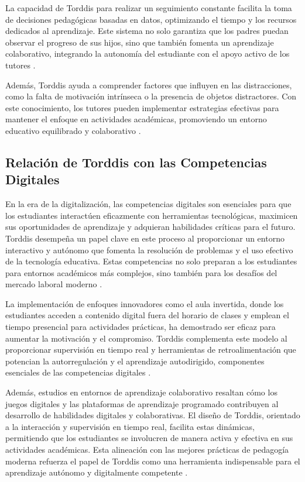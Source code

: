 \documentclass[a4paper,fleqn]{cas-sc}
\begin{document}
			La capacidad de Torddis para realizar un seguimiento constante facilita la toma de decisiones pedagógicas basadas en datos, optimizando el tiempo y los recursos dedicados al aprendizaje. Este sistema no solo garantiza que los padres puedan observar el progreso de sus hijos, sino que también fomenta un aprendizaje colaborativo, integrando la autonomía del estudiante con el apoyo activo de los tutores \citep{Navarro2024}.
		
			Además, Torddis ayuda a comprender factores que influyen en las distracciones, como la falta de motivación intrínseca o la presencia de objetos distractores. Con este conocimiento, los tutores pueden implementar estrategias efectivas para mantener el enfoque en actividades académicas, promoviendo un entorno educativo equilibrado y colaborativo \citep{Ackermans2025Young}.
		
		\subsection{Relación de Torddis con las Competencias Digitales}
			En la era de la digitalización, las competencias digitales son esenciales para que los estudiantes interactúen eficazmente con herramientas tecnológicas, maximicen sus oportunidades de aprendizaje y adquieran habilidades críticas para el futuro. Torddis desempeña un papel clave en este proceso al proporcionar un entorno interactivo y autónomo que fomenta la resolución de problemas y el uso efectivo de la tecnología educativa. Estas competencias no solo preparan a los estudiantes para entornos académicos más complejos, sino también para los desafíos del mercado laboral moderno \citep{Mohamed2018Implementing}.
		
			La implementación de enfoques innovadores como el aula invertida, donde los estudiantes acceden a contenido digital fuera del horario de clases y emplean el tiempo presencial para actividades prácticas, ha demostrado ser eficaz para aumentar la motivación y el compromiso. Torddis complementa este modelo al proporcionar supervisión en tiempo real y herramientas de retroalimentación que potencian la autorregulación y el aprendizaje autodirigido, componentes esenciales de las competencias digitales \citep{Mohamed2018Implementing,Echeverria2011AFramework}.
		
			Además, estudios en entornos de aprendizaje colaborativo resaltan cómo los juegos digitales y las plataformas de aprendizaje programado contribuyen al desarrollo de habilidades digitales y colaborativas. El diseño de Torddis, orientado a la interacción y supervisión en tiempo real, facilita estas dinámicas, permitiendo que los estudiantes se involucren de manera activa y efectiva en sus actividades académicas. Esta alineación con las mejores prácticas de pedagogía moderna refuerza el papel de Torddis como una herramienta indispensable para el aprendizaje autónomo y digitalmente competente \citep{Coffman2024Developing}.
				
\end{document}
